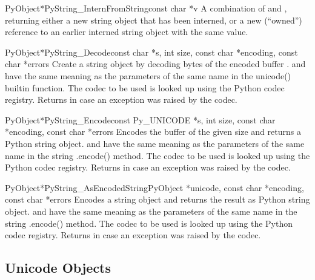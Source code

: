 \documentclass{manual}
\begin{document}
\begin{cfuncdesc}{PyObject*}{PyString_InternFromString}{const char *v}
A combination of  and
, returning either a new string object
that has been interned, or a new (``owned'') reference to an earlier
interned string object with the same value.
\end{cfuncdesc}

\begin{cfuncdesc}{PyObject*}{PyString_Decode}{const char *s,
                                               int size,
                                               const char *encoding,
                                               const char *errors}
Create a string object by decoding  bytes of the encoded
buffer .  and  have the same meaning
as the parameters of the same name in the unicode() builtin
function. The codec to be used is looked up using the Python codec
registry. Returns \NULL{} in case an exception was raised by the
codec.
\end{cfuncdesc}

\begin{cfuncdesc}{PyObject*}{PyString_Encode}{const Py_UNICODE *s,
                                               int size,
                                               const char *encoding,
                                               const char *errors}
Encodes the  buffer of the given size and returns a
Python string object.  and  have the same
meaning as the parameters of the same name in the string .encode()
method. The codec to be used is looked up using the Python codec
registry. Returns \NULL{} in case an exception was raised by the
codec.
\end{cfuncdesc}

\begin{cfuncdesc}{PyObject*}{PyString_AsEncodedString}{PyObject *unicode,
                                               const char *encoding,
                                               const char *errors}
Encodes a string object and returns the result as Python string
object.  and  have the same meaning as the
parameters of the same name in the string .encode() method. The codec
to be used is looked up using the Python codec registry. Returns
\NULL{} in case an exception was raised by the codec.
\end{cfuncdesc}


\subsection{Unicode Objects \label{unicodeObjects}}
\end{document}
